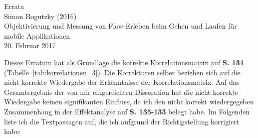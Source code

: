 \documentclass[12pt, twoside=semi, DIV=calc, pagesize, parskip=half, listof=totoc, bibliography=totoc, open=right, listof=nochaptergap, pointlessnumbers, final]{scrreprt}
\begin{document}

\begin{center}
\Huge Errata\\
\vspace{5mm}
\normalsize Simon Bogutzky (2016)\\
\normalsize Objektivierung und Messung von Flow-Erleben beim Gehen und Laufen für mobile Applikationen\\
\vspace{5mm}
\normalsize 20. Februar 2017\\
\end{center}

\setcounter{chapter}{5}
\setcounter{table}{6}

Dieses Erratum hat als Grundlage die korrekte Korrelationsmatrix auf \textbf{S. 131} (Tabelle~\ref{tab:korrelationen_3}). Die Korrekturen selber beziehen sich auf die nicht korrekte Wiedergabe der Erkenntnisse der Korrelationsmatrix. Auf das Gesamtergebnis der von mir eingereichten Disseration hat die nicht korrekte Wiedergabe keinen signifikanten Einfluss, da ich den nicht korrekt wiedergegeben Zusammenhang in der Effektanalyse auf \textbf{S. 135-133} belegt habe. Im Folgenden liste ich die Textpassagen auf, die ich aufgrund der Richtigstellung korrigiert habe:
\end{document}
